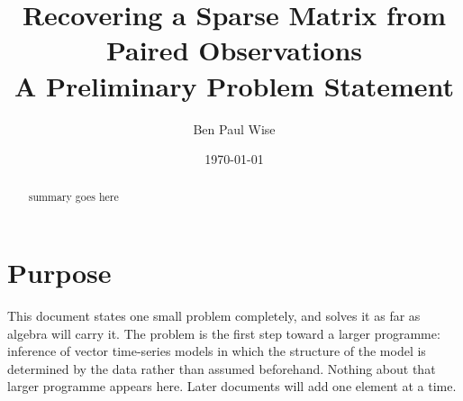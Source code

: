 %





\renewcommand{\thesection}{\arabic{section}}

\def\myversion{v01a}


\lfoot{\color{myDarkRed}\bf{DRAFT \myversion}}



\begin{titlepage}
\title{Recovering a Sparse Matrix from Paired Observations\\
       A Preliminary Problem Statement}
\author{Ben Paul Wise}
\date{\today}

\maketitle

\begin{abstract}
summary goes here
\end{abstract}

\end{titlepage}


\clearpage
\tableofcontents
\clearpage
\listoffigures
\clearpage
\listoftables
\clearpage


\raggedright

\section{Purpose}

This document states one small problem completely, and solves it as far as algebra
will carry it. The problem is the first step toward a larger programme: inference of
vector time-series models in which the structure of the model is determined by the
data rather than assumed beforehand. Nothing about that larger programme appears
here. Later documents will add one element at a time.

